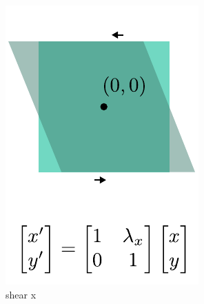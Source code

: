 \begin{figure}[t]
\begin{subfigure}[t]{0.195\linewidth}
        \includegraphics[width=\linewidth]{imgs/shear_x.pdf}
        \caption{\label{fig:shear_x} shear x}
    \end{subfigure}
    \begin{subfigure}[t]{0.195\linewidth}
        \centering

\end{subfigure}
\end{figure}
